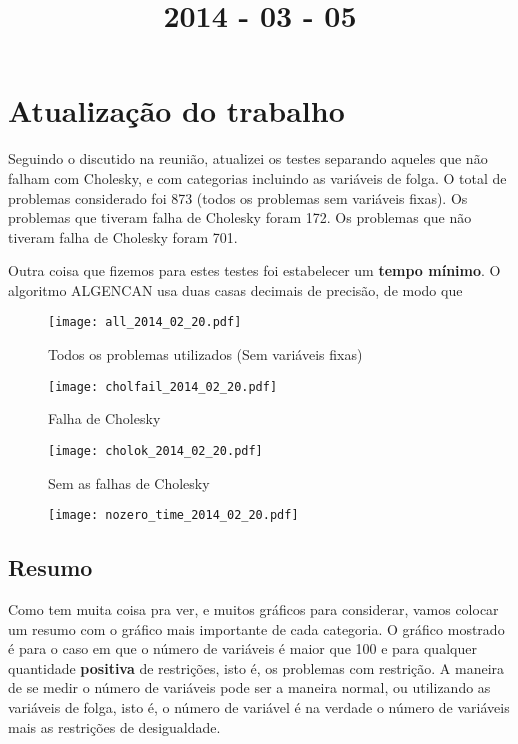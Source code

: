 \documentclass{article}
\title{2014 - 03 - 05}
\author{}
\date{}
\renewcommand{\emph}[1]{\textbf{#1}}
\begin{document}
\maketitle
\section{Atualização do trabalho}

Seguindo o discutido na reunião, atualizei os testes separando aqueles que não
falham com Cholesky, e com categorias incluindo as variáveis de folga.
O total de problemas considerado foi 873 (todos os problemas sem variáveis
fixas).
Os problemas que tiveram falha de Cholesky foram 172.
Os problemas que não tiveram falha de Cholesky foram 701.

Outra coisa que fizemos para estes testes foi estabelecer um {\bf tempo
mínimo}. O algoritmo ALGENCAN usa duas casas decimais de precisão, de modo que


\begin{figure}[H]
  \centering
  \texttt{[image: all\_2014\_02\_20.pdf]}
  \caption{Todos os problemas utilizados (Sem variáveis fixas) }
\end{figure}
\begin{figure}[H]
  \centering
  \texttt{[image: cholfail\_2014\_02\_20.pdf]}
  \caption{Falha de Cholesky}
\end{figure}
\begin{figure}[H]
  \centering
  \texttt{[image: cholok\_2014\_02\_20.pdf]}
  \caption{Sem as falhas de Cholesky}
\end{figure}
\begin{figure}[H]
  \centering
  \texttt{[image: nozero\_time\_2014\_02\_20.pdf]}
\end{figure}

\newpage
\subsection{Resumo}

Como tem muita coisa pra ver, e muitos gráficos para considerar, vamos colocar
um resumo com o gráfico mais importante de cada categoria.
O gráfico mostrado é para o caso em que o número de variáveis é maior que 100 e
para qualquer quantidade \emph{positiva} de restrições, isto é, os problemas com
restrição. A maneira de se medir o número de variáveis pode ser a maneira
normal, ou utilizando as variáveis de folga, isto é, o número de variável é na
verdade o número de variáveis mais as restrições de desigualdade.
\end{document}
